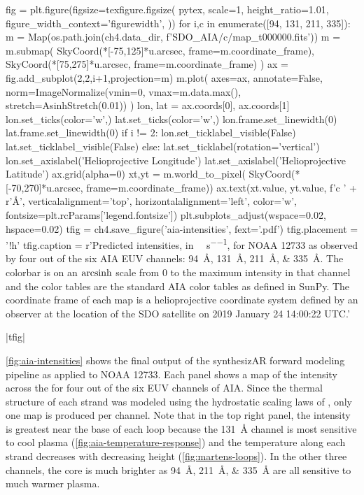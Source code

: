 \begin{pycode}[chapter4]
fig = plt.figure(figsize=texfigure.figsize(
    pytex,
    scale=1,
    height_ratio=1.01,
    figure_width_context='figurewidth',
))
for i,c in enumerate([94, 131, 211, 335]):
    m = Map(os.path.join(ch4.data_dir, f'SDO_AIA/{c}/map_t000000.fits'))
    m = m.submap(
        SkyCoord(*[-75,125]*u.arcsec, frame=m.coordinate_frame),
        SkyCoord(*[75,275]*u.arcsec, frame=m.coordinate_frame)
    )
    ax = fig.add_subplot(2,2,i+1,projection=m)
    m.plot(
        axes=ax,
        annotate=False,
        norm=ImageNormalize(vmin=0, vmax=m.data.max(),
                            stretch=AsinhStretch(0.01))
    )
    lon, lat = ax.coords[0], ax.coords[1]
    lon.set_ticks(color='w',)
    lat.set_ticks(color='w',)
    lon.frame.set_linewidth(0)
    lat.frame.set_linewidth(0)
    if i != 2:
        lon.set_ticklabel_visible(False)
        lat.set_ticklabel_visible(False)
    else:
        lat.set_ticklabel(rotation='vertical')
        lon.set_axislabel('Helioprojective Longitude')
        lat.set_axislabel('Helioprojective Latitude')
    ax.grid(alpha=0)
    xt,yt = m.world_to_pixel(
        SkyCoord(*[-70,270]*u.arcsec, frame=m.coordinate_frame))
    ax.text(xt.value, yt.value, f'{c} ' + r'\si{\angstrom}', 
            verticalalignment='top', horizontalalignment='left', color='w',
            fontsize=plt.rcParams['legend.fontsize'])
plt.subplots_adjust(wspace=0.02, hspace=0.02)
tfig = ch4.save_figure('aia-intensities', fext='.pdf')
tfig.placement = '!h'
tfig.caption = r'Predicted intensities, in \si{\dn\per\pixel\per\second}, for \AR{} NOAA 12733 as observed by four out of the six AIA EUV channels: \SIlist{94;131;211;335}{\angstrom}. The colorbar is on an $\operatorname{arcsinh}$ scale from 0 to the maximum intensity in that channel and the color tables are the standard AIA color tables as defined in SunPy. The coordinate frame of each map is a helioprojective coordinate system defined by an observer at the location of the SDO satellite on 2019 January 24 14:00:22 UTC.'
\end{pycode}
\py[chapter4]|tfig|

\autoref{fig:aia-intensities} shows the final output of the synthesizAR forward modeling pipeline as applied to NOAA 12733. Each panel shows a map of the intensity across the \AR{} for four out of the six EUV channels of AIA. Since the thermal structure of each strand was modeled using the hydrostatic scaling laws of \citet{martens_scaling_2010}, only one map is produced per channel. Note that in the top right panel, the intensity is greatest near the base of each loop because the \SI{131}{\angstrom} channel is most sensitive to cool plasma (\autoref{fig:aia-temperature-response}) and the temperature along each strand decreases with decreasing height (\autoref{fig:martens-loops}). In the other three channels, the core is much brighter as \SIlist{94;211;335}{\angstrom} are all sensitive to much warmer plasma.

